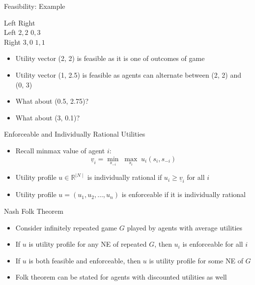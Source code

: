 \documentclass[11pt,aspectratio=169]{beamer}
\begin{document}
  
  \begin{frame}{Feasibility: Example}
   \begin{center}
    \hspace{-2em}
    \begin{game}{2}{2}
     		\> Left		\> Right		\\
     Left	\> $2, 2$	\> $0, 3$	\\
     Right	\> $3, 0$	\> $1, 1$
    \end{game}
   \end{center}
   \vspace{1em}
   \begin{itemize}[<+->]
    \item Utility vector (2, 2) is feasible as it is one of outcomes of game
    \item Utility vector (1, 2.5) is feasible as agents can alternate between (2, 2) and (0, 3)
    \item What about (0.5, 2.75)?
    \item What about (3, 0.1)?
   \end{itemize}
  \end{frame}


  \begin{frame}{Enforceable and Individually Rational Utilities}
   \begin{itemize}[<+->]
   \setlength{\itemsep}{1.2em}
    \item Recall \alert{minmax value} of agent $i$: 
    $$\underline{v}_i = \underset{s_{-i}}{\min} \; \underset{s_{i}}{\max} \; u_{i}(s_i,s_{-i})$$
    \item Utility profile $u \in  \mathbb{R} ^{\mid N \mid}$  is \alert{individually rational} if $u_{i}  \ge \underline{v}_i$ for all $i$
    \item Utility profile $u = (u_1,u_2,\dots,u_n)$ is \alert{enforceable} if it is individually rational
   \end{itemize}
  \end{frame}
  
  
  \begin{frame}{Nash Folk Theorem}
   \begin{itemize}[<+->]
   \setlength{\itemsep}{1.2em}
    \item Consider infinitely repeated game $G$ played by agents with \alert{average utilities}
    \item If $u$ is utility profile for any NE of repeated $G$, then $u_i$ is enforceable for all $i$
    \item If $u$ is both feasible and enforceable, then $u$ is utility profile for some NE of $G$
    \item Folk theorem can be stated for agents with discounted utilities as well
   \end{itemize}
  \end{frame}
  
\end{document}
